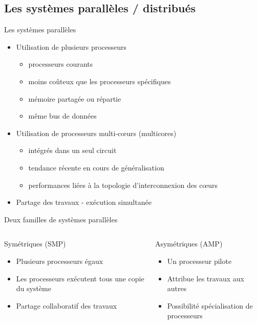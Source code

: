 \subsection{Les systèmes parallèles / distribués}
\begin{frame}{Les systèmes parallèles}
\begin{itemize} 
\item Utilisation de plusieurs processeurs
\begin{itemize}
\item processeurs courants
\item moins coûteux que les processeurs spécifiques
\item mémoire partagée ou répartie
\item même bus de données
\end{itemize}
\item Utilisation de processeurs multi-cœurs (multicores)
\begin{itemize}
\item intégrés dans un seul circuit
\item tendance récente en cours de généralisation
\item performances liées à la topologie d'interconnexion des cœurs
\end{itemize}
\item Partage des travaux - exécution simultanée
\end{itemize}
\end{frame}

\begin{frame}{Deux familles de systèmes parallèles}
\begin{columns}
\begin{block}{Symétriques (SMP)}
\begin{itemize}
\item Plusieurs processeurs égaux
\item Les processeurs exécutent tous une copie du système
\item Partage collaboratif des travaux
\end{itemize}
\end{block}
\begin{block}{Asymétriques (AMP)}
\begin{itemize}
\item Un processeur pilote
\item Attribue les travaux aux autres
\item Possibilité spécialisation de processeurs
\end{itemize}
\end{block}
\end{columns}
\end{frame}

